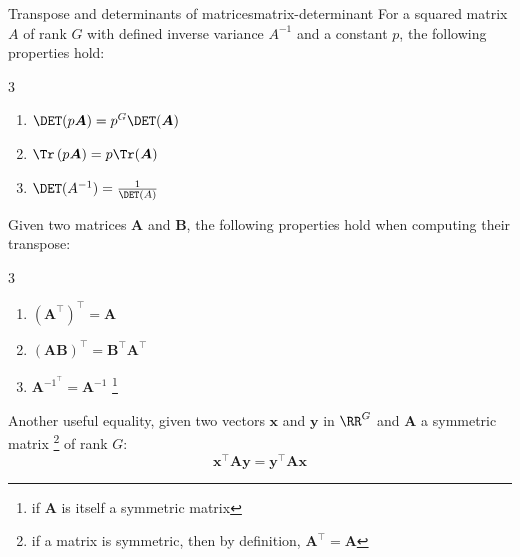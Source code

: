 \begin{Property}{Transpose and determinants of matrices}{matrix-determinant}
For a squared matrix $A$ of rank $G$ with defined inverse variance $A^{-1}$ and a constant $p$, the following properties hold:
\begin{multicols}{3}
\begin{enumerate}[label=\emph{\alph*})]
\item $\DET(p\boldsymbol{A})=p^G \DET (\boldsymbol{A})$
\item $\Tr\left(p \boldsymbol{A}\right)=p \Tr(\boldsymbol{A})$
\item $\DET(A^{-1})=\frac{1}{\DET(A)}$
\end{enumerate}
\end{multicols}

Given two matrices $\boldsymbol{A}$ and $\boldsymbol{B}$, the following properties hold when computing their transpose:
\begin{multicols}{3}
\begin{enumerate}
    \item $(\boldsymbol{A}^\top)^\top=\boldsymbol{A}$
    \item $(\boldsymbol{A}\boldsymbol{B})^\top=\boldsymbol{B}^\top\boldsymbol{A}^\top$
    \item $\boldsymbol{A}^{{-1}^\top}=\boldsymbol{A}^{-1}$ \footnote{if $\boldsymbol{A}$ is itself a symmetric matrix}
\end{enumerate}
\end{multicols}

Another useful equality, given two vectors $\boldsymbol{x}$ and $\boldsymbol{y}$ in $\RR^G$ and $\boldsymbol{A}$ a symmetric matrix \footnote{if a matrix is symmetric, then by definition, $\boldsymbol{A}^\top=\boldsymbol{A}$} of rank $G$:
\begin{equation*}
    \boldsymbol{x}^\top \boldsymbol{A} \boldsymbol{y} = \boldsymbol{y}^\top \boldsymbol{A} \boldsymbol{x}
\end{equation*}
\end{Property}




